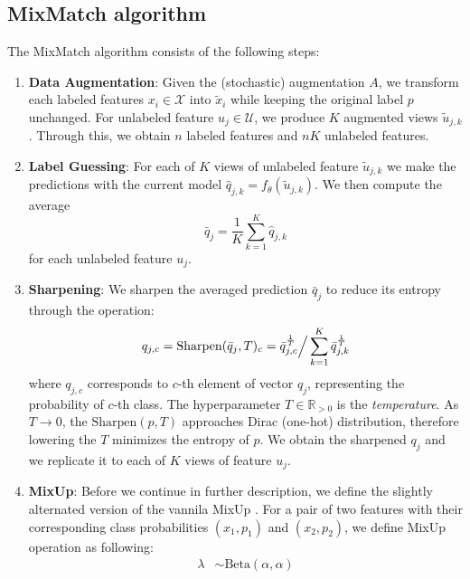 \subsection{MixMatch algorithm}
The MixMatch algorithm consists of the following steps:
\begin{enumerate}
    \item \textbf{Data Augmentation}: Given the (stochastic) augmentation $A$, we transform each labeled features $x_i \in \mathcal{X}$ into $\tilde{x}_i$ while keeping the 
        original label $p$ unchanged. For unlabeled feature $u_j \in \mathcal{U}$, we produce $K$ augmented views $\tilde{u}_{j,k}$. Through this, we obtain $n$ labeled features and
        $nK$ unlabeled features. 
    \item \textbf{Label Guessing}\label{label-guessing}: For each of $K$ views of unlabeled feature $\tilde{u}_{j,k}$ we make the predictions with the current model 
        $\hat{q}_{j,k} = f_\theta(\tilde{u}_{j,k})$. We then compute the average
            \begin{equation*}
                \bar{q}_{j} = \frac{1}{K}\sum_{k=1}^K \hat{q}_{j,k}
            \end{equation*}
        for each unlabeled feature $u_j$.
    \item \textbf{Sharpening}\label{sharpening}: We sharpen the averaged prediction $\bar{q}_{j}$ to reduce its entropy through the operation:
            \begin{equation*}
                q_{j,c} = \text{Sharpen}(\bar{q}_{j},T)_c = \bar{q}_{j,c}^{\frac{1}{T}} \Big{/} \sum_{k=1}^{K} \bar{q}_{j,k}^{\frac{1}{T}} 
            \end{equation*}
        where $q_{j,c}$ corresponds to $c$-th element of vector $q_{j}$, representing the probability of $c$-th class. 
        The hyperparameter $T \in \mathbb{R}_{>0}$ is the \textit{temperature}. As $T\to 0$, the $\text{Sharpen}(p,T)$ approaches Dirac (one-hot) distribution, 
        therefore lowering the $T$ minimizes the entropy of $p$. We obtain the sharpened $q_{j}$ and we replicate it to each of $K$ views of feature $u_{j}$.
    \item \textbf{MixUp}: Before we continue in further description, we define the slightly alternated version of the vannila MixUp \cite{mixup-2018}.
            For a pair of two features with their corresponding class probabilities $(x_1,p_1)$ and $(x_2,p_2)$, we define MixUp operation as following:
            \begin{align*}
                \lambda &\sim \text{Beta}(\alpha,\alpha) \\

\end{align*}
\end{enumerate}

